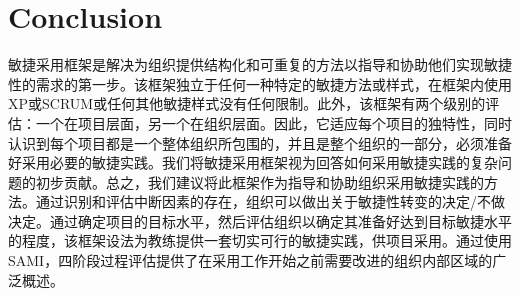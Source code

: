 \documentclass[twocolumn]{svjour3}[]
\begin{document}
\section{Conclusion}

敏捷采用框架是解决为组织提供结构化和可重复的方法以指导和协助他们实现敏捷性的需求的第一步。该框架独立于任何一种特定的敏捷方法或样式，在框架内使用XP或SCRUM或任何其他敏捷样式没有任何限制。此外，该框架有两个级别的评估：一个在项目层面，另一个在组织层面。因此，它适应每个项目的独特性，同时认识到每个项目都是一个整体组织所包围的，并且是整个组织的一部分，必须准备好采用必要的敏捷实践。我们将敏捷采用框架视为回答如何采用敏捷实践的复杂问题的初步贡献。总之，我们建议将此框架作为指导和协助组织采用敏捷实践的方法。通过识别和评估中断因素的存在，组织可以做出关于敏捷性转变的决定/不做决定。通过确定项目的目标水平，然后评估组织以确定其准备好达到目标敏捷水平的程度，该框架设法为教练提供一套切实可行的敏捷实践，供项目采用。通过使用SAMI，四阶段过程评估提供了在采用工作开始之前需要改进的组织内部区域的广泛概述。



\end{document}
